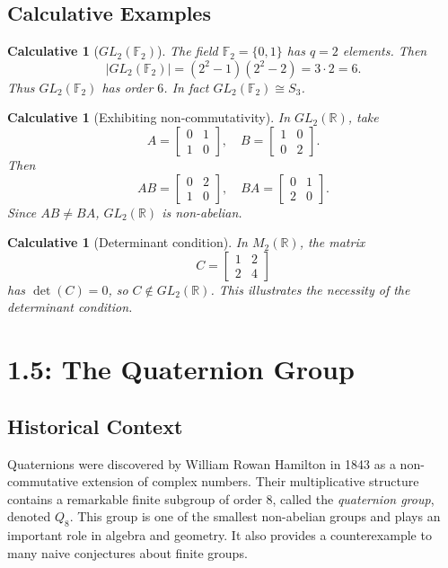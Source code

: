 \documentclass[12pt]{article}
\newtheorem{calculative}[theorem]{Calculative}
\theoremstyle{definition}
\begin{document}
\subsection*{Calculative Examples}

\begin{calculative}[$GL_2(\mathbb{F}_2)$]
The field $\mathbb{F}_2=\{0,1\}$ has $q=2$ elements. Then
\[
|GL_2(\mathbb{F}_2)|=(2^2-1)(2^2-2)=3\cdot 2=6.
\]
Thus $GL_2(\mathbb{F}_2)$ has order $6$. In fact $GL_2(\mathbb{F}_2)\cong S_3$.
\end{calculative}

\begin{calculative}[Exhibiting non-commutativity]
In $GL_2(\mathbb{R})$, take
\[
A=\begin{bmatrix}0&1\\1&0\end{bmatrix},\quad
B=\begin{bmatrix}1&0\\0&2\end{bmatrix}.
\]
Then
\[
AB=\begin{bmatrix}0&2\\1&0\end{bmatrix},\quad
BA=\begin{bmatrix}0&1\\2&0\end{bmatrix}.
\]
Since $AB\neq BA$, $GL_2(\mathbb{R})$ is non-abelian.
\end{calculative}

\begin{calculative}[Determinant condition]
In $M_2(\mathbb{R})$, the matrix
\[
C=\begin{bmatrix}1&2\\2&4\end{bmatrix}
\]
has $\det(C)=0$, so $C\notin GL_2(\mathbb{R})$.
This illustrates the necessity of the determinant condition.
\end{calculative}

\newpage

\dotfill
\section*{1.5: The Quaternion Group}
\dotfill

\subsection*{Historical Context}
Quaternions were discovered by William Rowan Hamilton in 1843 as a non-commutative extension
of complex numbers. Their multiplicative structure contains a remarkable finite subgroup of order $8$,
called the \emph{quaternion group}, denoted $Q_8$.  
This group is one of the smallest non-abelian groups and plays an important role in algebra and geometry.
It also provides a counterexample to many naive conjectures about finite groups.
\end{document}
